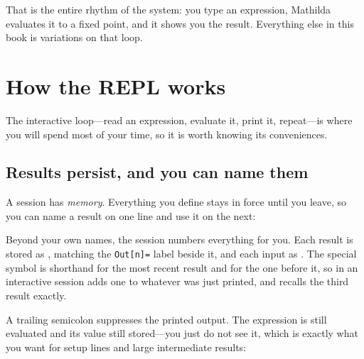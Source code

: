 \noindent
That is the entire rhythm of the system: you type an expression, Mathilda evaluates
it to a fixed point, and it shows you the result. Everything else in this book is
variations on that loop.

\section{How the REPL works}
\label{sec:repl}

The interactive loop---read an expression, evaluate it, print it, repeat---is where
you will spend most of your time, so it is worth knowing its conveniences.

\subsection{Results persist, and you can name them}
\label{sec:session-state}

A session has \emph{memory}. Everything you define stays in force until you leave, so
you can name a result on one line and use it on the next:

\begin{codepairs}
\end{codepairs}

Beyond your own names, the session numbers everything for you.
Each result is stored as , matching the \texttt{Out[n]=} label beside
it, and each input as . The special symbol \mcode{\%} is shorthand for
the most recent result and \mcode{\%\%} for the one before it, so in an interactive
session  adds one to whatever was just printed, and 
recalls the third result exactly.%

A trailing semicolon suppresses the printed output. The expression is still
evaluated and its value still stored---you just do not see it, which is exactly what
you want for setup lines and large intermediate results:

